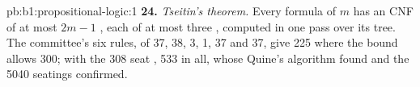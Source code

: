 \begin{solution}{pb:b1:propositional-logic:1}
\textbf{24.} \emph{Tseitin's theorem.} Every formula of  $m$ has an  CNF of at most $2m - 1$ ,
each of at most three , computed in one pass over its tree. The committee's six rules, of
 37, 38, 3, 1, 37 and 37, give 225  where the bound allows 300; with the 308 seat , 533  in
all, whose  Quine's algorithm found and the 5040 seatings confirmed.
\end{solution}
